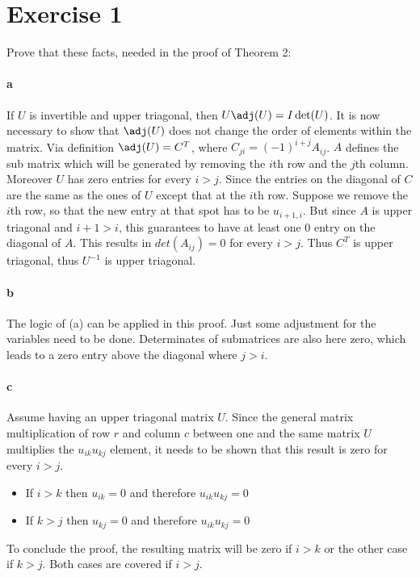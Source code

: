
\section{Exercise 1}
Prove that these facts, needed in the proof of Theorem 2:
\paragraph{a}
If $U$ is invertible and upper triagonal, then $U \adj(U) = I \det(U)$. 
It is now necessary to show that $\adj(U)$ does not change the order of elements within the matrix.
Via definition $\adj(U) = C^T$, where $C_{ji} = (-1)^{i+j} A_{ij}$. $A$ defines the sub matrix which will be generated by removing the $i$th row and the $j$th column.
Moreover $U$ has zero entries for every $i > j$.
Since the entries on the diagonal of $C$ are the same as the ones of $U$ except that at the $i$th row. 
Suppose we remove the $i$th row, so that the new entry at that spot has to be $u_{i+1,i}$. But since $A$ is upper triagonal and $i+1>i$, this guarantees to have at least one 0 entry on the diagonal of $A$. This results in $det(A_{ij}) = 0$ for every $i > j$. Thus $C^T$ is upper triagonal, thus $U^{-1}$ is upper triagonal.

\paragraph{b}


The logic of (a) can be applied in this proof. Just some adjustment for the variables need to be done. Determinates of submatrices are also here zero, which leads to a zero entry above the diagonal where $j >i$.

\paragraph{c}

Assume having an upper triagonal matrix $U$. Since the general matrix multiplication of row $r$ and column $c$ between one and the same matrix $U$ multiplies the $u_{ik} u_{kj}$ element, it needs to be shown that this result is zero for every $i > j$.
\begin{itemize}
\item If $ i > k $ then $u_{ik} = 0$ and therefore $u_{ik} u_{kj} =0 $
\item If $ k > j $ then $u_{kj} = 0$ and therefore $u_{ik} u_{kj} =0 $
\end{itemize}
To conclude the proof, the resulting matrix will be zero if $ i > k $ or the other case if $k>j$. Both cases are covered if $ i > j$.


